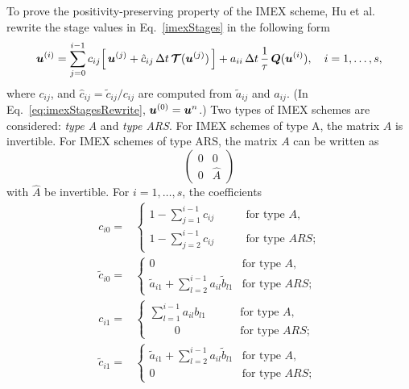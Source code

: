 To prove the positivity-preserving property of the IMEX scheme, Hu et al. \cite{hu_etal_2017} rewrite the stage values in Eq.~\eqref{imexStages} in the following form
\begin{equation}
  \boldsymbol{u}^{(i)}
  =\sum_{j=0}^{i-1}c_{ij}\Big[\,\boldsymbol{u}^{(j)}+\hat{c}_{ij}\,\Delta t\,\boldsymbol{\mathcal{T}}(\boldsymbol{u}^{(j)})\,\Big]
  +a_{ii}\,\Delta t\,\frac{1}{\tau}\,\boldsymbol{Q}(\boldsymbol{u}^{(i)}),\quad i=1,\ldots,s,
  \label{eq:imexStagesRewrite}
\end{equation}
where $c_{ij}$, and $\hat{c}_{ij}=\tilde{c}_{ij}/c_{ij}$ are computed from $\tilde{a}_{ij}$ and $a_{ij}$.
(In Eq.~\eqref{eq:imexStagesRewrite}, $\boldsymbol{u}^{(0)}=\boldsymbol{u}^{n}$.)  
Two types of IMEX schemes are considered: \emph{type A} and \emph{type ARS}.  
For IMEX schemes of type A, the matrix $A$ is invertible.  
For IMEX schemes of type ARS, the matrix $A$ can be written as
\[\left( 
   \begin{matrix} 
       0 & 0 \\ 
       0 & \hat{A}
   \end{matrix}
\right)\]
with $\hat{A}$ be invertible.
For $i=1,\ldots,s$, the coefficients
\begin{align*}
  c_{i0}
  =&\left\{
  \begin{array}{cl}
    1 - \sum_{j=1}^{i-1}c_{ij}  & \qquad \text{for type $A$,} \\
    1 - \sum_{j=2}^{i-1}c_{ij}  & \qquad \text{for type $ARS$;}
  \end{array}
  \right.\\
  \tilde{c}_{i0}
  =&\left\{
  \begin{array}{cl}
    0  & \text{for type $A$,} \\
   \tilde{a}_{i1} + \sum_{l=2}^{i-1}a_{il}\tilde{b}_{l1}  & \text{for type $ARS$;}
  \end{array}
  \right.\\
  c_{i1}
    =&\left\{
    \begin{array}{cl}
      \sum_{l =1}^{i-1} a_{il}b_{l1} & \qquad ~\text{for type $A$,} \\
      \qquad ~ 0  & \qquad ~\text{for type $ARS$;}
    \end{array}
    \right.\\
    \tilde{c}_{i1}
    =&\left\{
      \begin{array}{cl}
       \tilde{a}_{i1} + \sum_{l=2}^{i-1}a_{il}\tilde{b}_{l1} & \text{for type $A$,} \\
       0  & \text{for type $ARS$;}
      \end{array}
      \right.
\end{align*}

